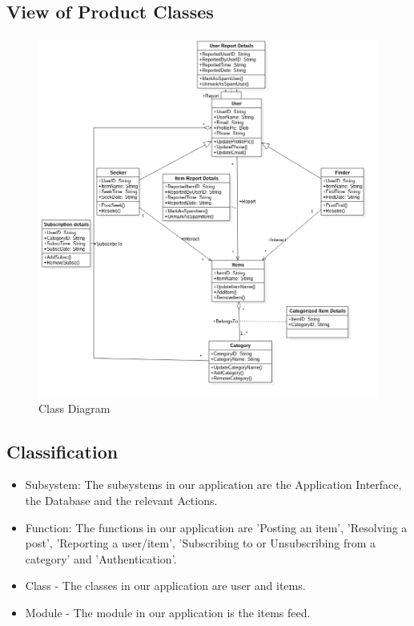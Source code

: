 \documentclass[a4paper,12pt]{article}
\begin{document}
\subsection{View of Product Classes}
\begin{figure}[h!]
  \includegraphics[width=1\textwidth]{class}
  \caption{Class Diagram}
\end{figure}
\subsection{Classification}
\begin{itemize}
\item Subsystem: The subsystems in our application are the Application Interface, the Database and the relevant Actions. 
\item Function: The functions in our application are 'Posting an item', 'Resolving a post', 'Reporting a user/item', 'Subscribing to or Unsubscribing from a category' and 'Authentication'. 
\item Class - The classes in our application are user and items. 
\item Module - The module in our application is the items feed.
\end{itemize}
\end{document}
